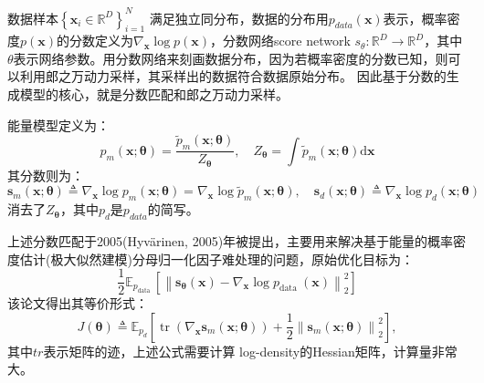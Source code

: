 \documentclass[lang=cn,newtx,10pt,scheme=chinese]{elegantbook}
\begin{document}

数据样本$\left\{\mathbf{x}_i \in \mathbb{R}^D\right\}_{i=1}^N$ 满足独立同分布，数据的分布用$p_{data}(\mathbf{x})$表示，概率密度$p(\mathbf{x})$的分数定义为$\nabla_{\mathbf{x}} \log p(\mathbf{x})$，分数网络score network $s_{\theta}:\mathbb{R}^D \rightarrow \mathbb{R}^D$，其中$\theta$表示网络参数。用分数网络来刻画数据分布，因为若概率密度的分数已知，则可以利用郎之万动力采样，其采样出的数据符合数据原始分布。 因此基于分数的生成模型的核心，就是分数匹配和郎之万动力采样。

能量模型定义为：
\begin{equation}
p_m(\mathbf{x} ; \boldsymbol{\theta})=\frac{\tilde{p}_m(\mathbf{x} ; \boldsymbol{\theta})}{Z_{\boldsymbol{\theta}}}, \quad Z_{\boldsymbol{\theta}}=\int \tilde{p}_m(\mathbf{x} ; \boldsymbol{\theta}) \mathrm{d} \mathbf{x}
\end{equation}
其分数则为：
\begin{equation}
\mathbf{s}_m(\mathbf{x} ; \boldsymbol{\theta}) \triangleq \nabla_{\mathbf{x}} \log p_m(\mathbf{x} ; \boldsymbol{\theta})=\nabla_{\mathbf{x}} \log \tilde{p}_m(\mathbf{x} ; \boldsymbol{\theta}), \quad  \mathbf{s}_d(\mathbf{x} ; \boldsymbol{\theta}) \triangleq \nabla_{\mathbf{x}} \log p_d(\mathbf{x} ; \boldsymbol{\theta})
\end{equation}
消去了$Z_{\boldsymbol{\theta}}$，其中$p_d$是$p_{data}$的简写。

上述分数匹配于2005(Hyvärinen, 2005)年被提出，主要用来解决基于能量的概率密度估计(极大似然建模)分母归一化因子难处理的问题，原始优化目标为：
\begin{equation}
\frac{1}{2} \mathbb{E}_{p_{\text {data }}}\left[\left\|\mathbf{s}_{\boldsymbol{\theta}}(\mathbf{x})-\nabla_{\mathbf{x}} \log p_{\text {data }}(\mathbf{x})\right\|_2^2\right]
\end{equation}
该论文得出其等价形式：
\begin{equation}
J(\boldsymbol{\theta}) \triangleq \mathbb{E}_{p_d}\left[\operatorname{tr}\left(\nabla_{\mathbf{x}} \mathbf{s}_m(\mathbf{x} ; \boldsymbol{\theta})\right)+\frac{1}{2}\left\|\mathbf{s}_m(\mathbf{x} ; \boldsymbol{\theta})\right\|_2^2\right],
\end{equation}
其中$tr$表示矩阵的迹，上述公式需要计算 log-density的Hessian矩阵，计算量非常大。
\end{document}
